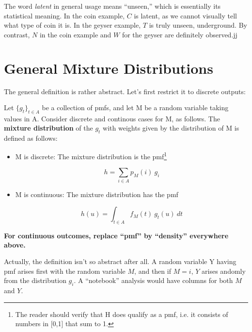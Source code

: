 The word \textit{latent} in general usage means ``unseen,'' which is
essentially its statistical meaning.  In the coin example, $C$ is
latent, as we cannot visually tell what type of coin it is.  In the
geyser example, $T$ is truly unseen, underground.  By contrast, $N$
in the coin example and $W$ for the geyser are definitely observed.jj

\section{General Mixture Distributions}
\label{genmix}

The general definition is rather abstract.  Let's first restrict it to
discrete outputs:

\begin{definition} Let $\{g_t\}_{t \in A}$ be a collection of pmfs, and
let M be a random variable taking values in A.  Consider discrete and
continous cases for M, as follows.  The {\bf mixture distribution} of
the $g_t$ with weights given by the distribution of M is defined as
follows:

\begin{itemize}

\item M is discrete:  The mixture distribution is the pmf\footnote{The
reader should verify that H does qualify as a pmf, i.e. it consists of
numbers in [0,1] that sum to 1.}

\begin{equation}
\label{hsum}
h = \sum_{i \in A} p_M(i) ~ g_i
\end{equation}

\item M is continuous:  The mixture distribution has the pmf 

\begin{equation}
\label{continmix}
h(u) = \int_{t \in A} f_M(t)~  g_t(u) ~ dt
\end{equation}

\end{itemize}

{\bf For continuous outcomes, replace ``pmf'' by ``density'' everywhere
above.}

\end{definition}

\vskip 0.5in

Actually, the definition isn't so abstract after all.  A random variable
Y having pmf arises first with the random variable $M$, and then if $M =
i$, $Y$ arises andomly from the distribution $g_i$.  A ``notebook''
analysis would have columns for both $M$ and $Y$.


